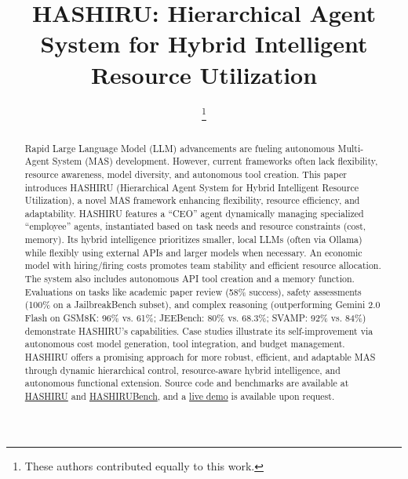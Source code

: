 \documentclass[conference]{IEEEtran}
\begin{document}
\title{HASHIRU: Hierarchical Agent System for Hybrid Intelligent Resource Utilization}

\author{
  \and
  \and
  \thanks{These authors contributed equally to this work.}
}
\maketitle
\begin{abstract}
Rapid Large Language Model (LLM) advancements are fueling autonomous Multi-Agent System (MAS) development. However, current frameworks often lack flexibility, resource awareness, model diversity, and autonomous tool creation. This paper introduces HASHIRU (Hierarchical Agent System for Hybrid Intelligent Resource Utilization), a novel MAS framework enhancing flexibility, resource efficiency, and adaptability. HASHIRU features a ``CEO'' agent dynamically managing specialized ``employee'' agents, instantiated based on task needs and resource constraints (cost, memory). Its hybrid intelligence prioritizes smaller, local LLMs (often via Ollama) while flexibly using external APIs and larger models when necessary. An economic model with hiring/firing costs promotes team stability and efficient resource allocation. The system also includes autonomous API tool creation and a memory function. Evaluations on tasks like academic paper review (58\% success), safety assessments (100\% on a JailbreakBench subset), and complex reasoning (outperforming Gemini 2.0 Flash on GSM8K: 96\% vs. 61\%; JEEBench: 80\% vs. 68.3\%; SVAMP: 92\% vs. 84\%) demonstrate HASHIRU's capabilities. Case studies illustrate its self-improvement via autonomous cost model generation, tool integration, and budget management. HASHIRU offers a promising approach for more robust, efficient, and adaptable MAS through dynamic hierarchical control, resource-aware hybrid intelligence, and autonomous functional extension.
Source code and benchmarks are available at \href{https://github.com/HASHIRU-AI/HASHIRU}{HASHIRU} and \href{https://github.com/HASHIRU-AI/HASHIRUBench}{HASHIRUBench}, and a \href{https://hashiruagentx-hashiruai.hf.space}{live demo} is available upon request.
\end{abstract}
\end{document}

